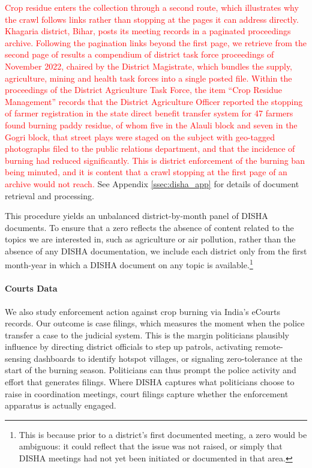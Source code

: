 \documentclass[12pt]{article}
\begin{document}
\textcolor{red}{Crop residue enters the collection through a second route, which illustrates why the crawl follows links rather than stopping at the pages it can address directly. Khagaria district, Bihar, posts its meeting records in a paginated proceedings archive. Following the pagination links beyond the first page, we retrieve from the second page of results a compendium of district task force proceedings of November 2022, chaired by the District Magistrate, which bundles the supply, agriculture, mining and health task forces into a single posted file. Within the proceedings of the District Agriculture Task Force, the item ``Crop Residue Management'' records that the District Agriculture Officer reported the stopping of farmer registration in the state direct benefit transfer system for 47 farmers found burning paddy residue, of whom five in the Alauli block and seven in the Gogri block, that street plays were staged on the subject with geo-tagged photographs filed to the public relations department, and that the incidence of burning had reduced significantly. This is district enforcement of the burning ban being minuted, and it is content that a crawl stopping at the first page of an archive would not reach.} See Appendix \ref{ssec:disha_app} for details of document retrieval and processing.

This procedure yields an unbalanced district-by-month panel of DISHA documents. To ensure that a zero reflects the absence of content related to the topics we are interested in, such as agriculture or air pollution, rather than the absence of any DISHA documentation, we include each district only from the first month-year in which a DISHA document on any topic is available.\footnote{This is because prior to a district's first documented meeting, a zero would be ambiguous: it could reflect that the issue was not raised, or simply that DISHA meetings had not yet been initiated or documented in that area.}


\paragraph{Courts Data} 
We also study enforcement action against crop burning via India's eCourts records. Our outcome is case filings, which measures the moment when the police transfer a case to the judicial system. This is the margin politicians plausibly influence by directing district officials to step up patrols, activating remote-sensing dashboards to identify hotspot villages, or signaling zero-tolerance at the start of the burning season. Politicians can thus prompt the police activity and effort that generates filings. Where DISHA captures what politicians choose to raise in coordination meetings, court filings capture whether the enforcement apparatus is actually engaged.
\end{document}
